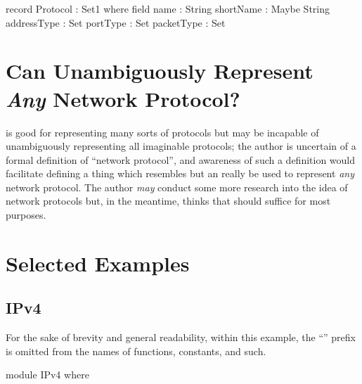 \documentclass{report}
\begin{document}
\begin{code}
record Protocol : Set1 where
  field
    name : String
    shortName : Maybe String
    addressType : Set
    portType : Set
    packetType : Set
\end{code}

\section{Can  Unambiguously Represent \emph{Any} Network Protocol?}
 is good for representing many sorts of protocols but may be incapable of unambiguously representing all imaginable protocols; the author is uncertain of a formal definition of ``network protocol'', and awareness of such a definition would facilitate defining a thing which resembles  but an really be used to represent \emph{any} network protocol.  The author \emph{may} conduct some more research into the idea of network protocols but, in the meantime, thinks that  should suffice for most purposes.

\section{Selected Examples}

\subsection{IPv4}
For the sake of brevity and general readability, within this example, the ``'' prefix is omitted from the names of functions, constants, and such.

\begin{code}
module IPv4 where
\end{code}
\end{document}

